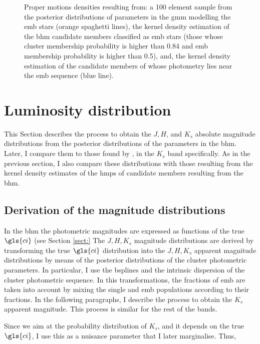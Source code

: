 \begin{figure}[ht!]
\begin{subfigure}[t]{0.45\textwidth}
        \caption{}
    \end{subfigure}
\caption{Proper motions densities resulting from: a 100 element sample from the posterior distributions of parameters in the \gls{gmm} modelling the \gls{emb} stars (orange spaghetti lines), the kernel density estimation of the \gls{bhm} candidate members classified as \gls{emb} stars (those whose cluster membership probability is higher than 0.84 and \gls{emb} membership probability is higher than 0.5), and, the kernel density estimation of the candidate members of \citet{Bouy2015} whose photometry lies near the \gls{emb} sequence (blue line).}
\label{fig:PMBs}
\end{figure}

\section{Luminosity distribution}
\label{sect:luminosity}
This Section describes the process to obtain the $J,H$, and $K_s$ absolute magnitude distributions from the posterior distributions of the parameters in the \gls{bhm}. Later, I compare them to those found by \citet{Bouy2015}, in the $K_s$ band specifically. As in the previous section, I also compare these distributions with those resulting from the kernel density estimates of the \gls{hmps} of candidate members resulting from the \gls{bhm}.

\subsection{Derivation of the magnitude distributions}
\label{subsect:deriveluminosity}

In the \gls{bhm} the photometric magnitudes are expressed as functions of the true $\gls{ci}$ (see Section \ref{sect:}
The $J,H,K_s$ magnitude distributions are derived by transforming the true $\gls{ci}$ distribution into the $J,H,K_s$ apparent magnitude distributions by means of the posterior distributions of the cluster photometric parameters. In particular, I use the \glspl{bspline} and the intrinsic dispersion of the cluster photometric sequence. In this transformations, the fractions of \gls{emb} are taken into account by mixing the single and \gls{emb} populations according to their fractions. In the following paragraphs, I describe the process to obtain the $K_s$ apparent magnitude. This process is similar for the rest of the bands. 

Since we aim at the probability distribution of $K_s$, and it depends on the true $\gls{ci}$, I use this as a nuisance parameter that I later marginalise. Thus, 

